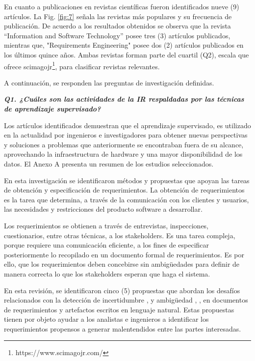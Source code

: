 \documentclass[journal]{IEEEtran}
\begin{document}
En cuanto a publicaciones en revistas científicas fueron identificados nueve (9) artículos. La Fig. \ref{fig:7} señala las revistas más populares y su frecuencia de publicación. De acuerdo a los resultados obtenidos se observa que la revista “Information and Software Technology” posee tres (3) artículos publicados, mientras que, "Requirements Engineering" posee dos (2) artículos publicados en los últimos quince años. Ambas revistas forman parte del cuartil (Q2), escala que ofrece scimagojr\footnote{https://www.scimagojr.com/}, para clasificar revistas relevantes. 

A continuación, se responden las preguntas de investigación definidas.

\emph{\textbf{Q1. ¿Cuáles son las actividades de la IR respaldadas por las técnicas de aprendizaje supervisado?}}

Los artículos identificados demuestran que el aprendizaje supervisado, es utilizado en la actualidad por ingenieros e investigadores para obtener nuevas perspectivas y soluciones a problemas que anteriormente se encontraban fuera de su alcance, aprovechando la infraestructura de hardware y una mayor disponibilidad de los datos. El Anexo A presenta un resumen de los estudios seleccionados.

En esta investigación se identificaron métodos y propuestas que apoyan las tareas de obtención y especificación de requerimientos. La obtención de requerimientos es la tarea que determina, a través de la comunicación con los clientes y usuarios, las necesidades y restricciones del producto software a desarrollar.
 
Los requerimientos se obtienen a través de entrevistas, inspecciones, cuestionarios, entre otras técnicas, a los stakeholders. Es una tarea compleja, porque requiere una comunicación eficiente, a los fines de especificar posteriormente lo recopilado en un documento formal de requerimientos. Es por ello, que los requerimientos deben concebirse sin ambigüedades para definir de manera correcta lo que los stakeholders esperan que haga el sistema.

En esta revisión, se identificaron cinco (5) propuestas que abordan los desafíos relacionados con la detección de incertidumbre \cite{yang2012speculative}, \cite{Knauss201685} y ambigüedad \cite{yang2010extending}, \cite{Yang2011}, \cite{Ott2013} en documentos de requerimientos y artefactos escritos en lenguaje natural. Estas propuestas tienen por objeto ayudar a los analistas e ingenieros a identificar los requerimientos propensos a generar malentendidos entre las partes interesadas.
\end{document}
